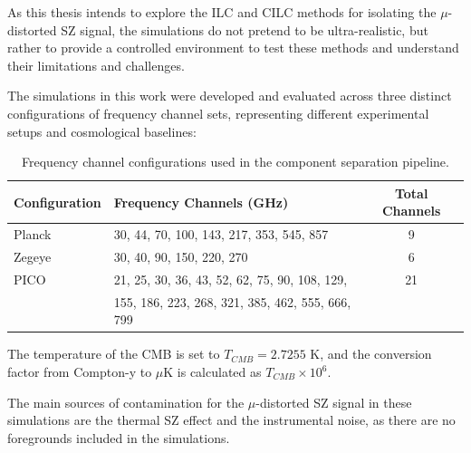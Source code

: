 As this thesis intends to explore the ILC and CILC methods for isolating the $\mu$-distorted SZ signal, the simulations do not pretend to be ultra-realistic,
but rather to provide a controlled environment to test these methods and understand their limitations and challenges.


The simulations in this work were developed and evaluated across three distinct configurations of frequency channel sets, representing different experimental setups and cosmological baselines:
\begin{table}[htbp]
    \centering
    \begin{tabular}{|l|l|c|}
        \toprule
        \textbf{Configuration} & \textbf{Frequency Channels (GHz)} & \textbf{Total Channels} \\
        \midrule
        Planck & 30, 44, 70, 100, 143, 217, 353, 545, 857 & 9 \\
        \midrule
        Zegeye & 30, 40, 90, 150, 220, 270 & 6 \\
        \midrule
        PICO & 21, 25, 30, 36, 43, 52, 62, 75, 90, 108, 129, & 21 \\
             & 155, 186, 223, 268, 321, 385, 462, 555, 666, 799 & \\
        \bottomrule
    \end{tabular}
    \caption{Frequency channel configurations used in the component separation pipeline.}
    \label{tab:frequency_channels}
\end{table}

The temperature of the CMB is set to $T_{CMB} = 2.7255$ K, and the conversion factor from Compton-y to $\mu$K is calculated as $T_{CMB} \times 10^6$.

The main sources of contamination for the $\mu$-distorted SZ signal in these simulations are the thermal SZ effect and the instrumental noise, as there are no foregrounds included in the simulations.




